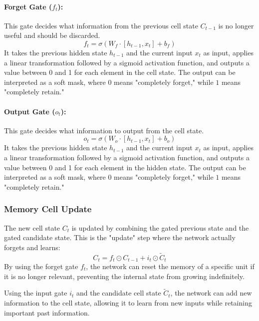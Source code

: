 \paragraph{Forget Gate ($f_t$):}
This gate decides what information from the previous cell state $C_{t-1}$ is no longer useful and should be discarded.
\begin{equation}
    f_t = \sigma\left(W_f \cdot [h_{t-1}, x_t] + b_f\right)
\end{equation}
It takes the previous hidden state $h_{t-1}$ and the current input $x_t$ as input, applies a linear transformation followed by a sigmoid activation function,
and outputs a value between 0 and 1 for each element in the cell state. 
The output can be interpreted as a soft mask, where $0$ means "completely forget," while $1$ means "completely retain."

\paragraph{Output Gate ($o_t$):} 
This gate decides what information to output from the cell state. 
\begin{equation}
    o_t = \sigma\left(W_o \cdot [h_{t-1}, x_t] + b_o\right)
\end{equation}
It takes the previous hidden state $h_{t-1}$ and the current input $x_t$ as input, applies a linear transformation followed by a sigmoid activation function,
and outputs a value between 0 and 1 for each element in the hidden state. 
The output can be interpreted as a soft mask, where $0$ means "completely forget," while $1$ means "completely retain."

\subsubsection{Memory Cell Update}
The new cell state $C_t$ is updated by combining the gated previous state and the gated candidate state. 
This is the "update" step where the network actually forgets and learns:
\begin{equation}
    C_t = f_t \odot C_{t-1} + i_t \odot \tilde{C}_t
\end{equation}
By using the forget gate $f_t$, the network can reset the memory of a specific unit if it is no longer relevant, preventing the internal state from growing indefinitely.

Using the input gate $i_t$ and the candidate cell state $\tilde{C}_t$, the network can add new information to the cell state, allowing it to learn from new inputs while retaining important past information.

